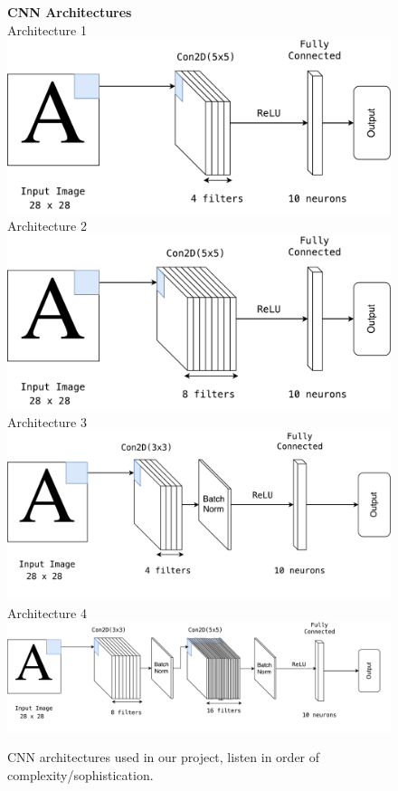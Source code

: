 \documentclass[letterpaper,12pt]{article}
\begin{document}
\begin{figure}[p]
\centering
\textbf{CNN Architectures\\}
\vspace{2em}
{Architecture 1\\}
\vspace{0.5em}
  \includegraphics[width=0.5\linewidth]{diag_1}
\vfill
\vspace{1em}
{Architecture 2\\}
\vspace{0.5em}
  \includegraphics[width=0.5\linewidth]{diag_2}
\vfill
\vspace{1em}
{Architecture 3\\}
\vspace{0.5em}
  \includegraphics[width=0.55\linewidth]{diag_3}
\vfill
\vspace{1em}
{Architecture 4\\}
\vspace{0.5em}
  \includegraphics[width=0.9\linewidth]{diag_4}
\vfill
\vspace{2em}
\caption{CNN architectures used in our project, listen in order of complexity/sophistication.}
\label{fig:CNN_archi}
\end{figure}
\end{document}
